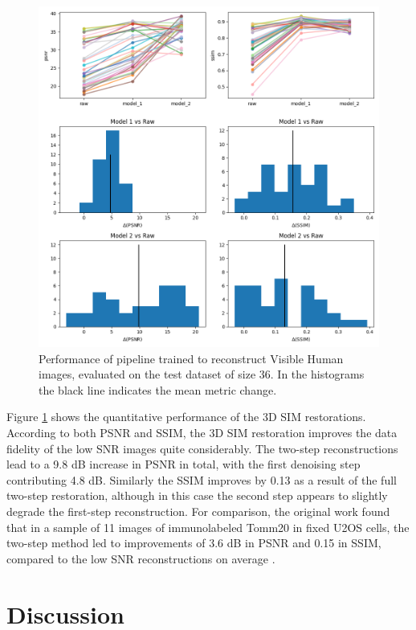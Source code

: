 \documentclass[12pt]{article}
\begin{document}
\begin{figure}[tbp]
    \includegraphics[scale=0.55, center]{figures/m021_m022_pipeline_stats.png}
    \caption{Performance of pipeline trained to reconstruct Visible Human images, evaluated on the test dataset of size 36.
    In the histograms the black line indicates the mean metric change.}
    \label{fig:vh_stats}
\end{figure}

Figure \ref{fig:vh_stats} shows the quantitative performance of the 3D SIM restorations.
According to both PSNR and SSIM, the 3D SIM restoration improves the data fidelity of the low SNR images quite considerably.
The two-step reconstructions lead to a 9.8 dB increase in PSNR in total,
with the first denoising step contributing 4.8 dB.
Similarly the SSIM improves by 0.13 as a result of the full two-step restoration,
although in this case the second step appears to slightly degrade the first-step reconstruction.
For comparison, the original work found that in a sample of 11 images of immunolabeled Tomm20 in fixed U2OS cells,
the two-step method led to improvements of 3.6 dB in PSNR and 0.15 in SSIM, compared to the low SNR reconstructions on average \cite{keypaper}.

\section{Discussion}
\end{document}
